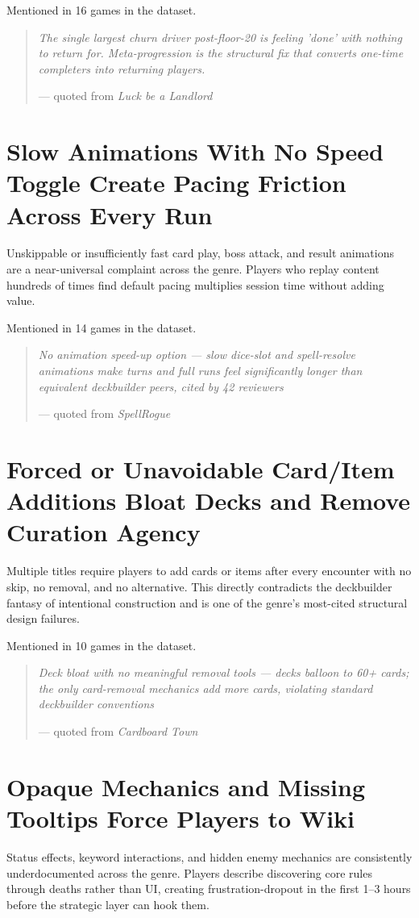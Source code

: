 \documentclass[11pt,letterpaper]{report}
\begin{document}
Mentioned in 16 games in the dataset.

\begin{quote}
\emph{The single largest churn driver post-floor-20 is feeling 'done' with nothing to return for. Meta-progression is the structural fix that converts one-time completers into returning players.}

— quoted from \emph{Luck be a Landlord}
\end{quote}
\section*{Slow Animations With No Speed Toggle Create Pacing Friction Across Every Run}
\label{sec:orge6fc1d0}
Unskippable or insufficiently fast card play, boss attack, and result animations are a near-universal complaint across the genre. Players who replay content hundreds of times find default pacing multiplies session time without adding value.

Mentioned in 14 games in the dataset.

\begin{quote}
\emph{No animation speed-up option — slow dice-slot and spell-resolve animations make turns and full runs feel significantly longer than equivalent deckbuilder peers, cited by 42 reviewers}

— quoted from \emph{SpellRogue}
\end{quote}
\section*{Forced or Unavoidable Card/Item Additions Bloat Decks and Remove Curation Agency}
\label{sec:orgecfb5f4}
Multiple titles require players to add cards or items after every encounter with no skip, no removal, and no alternative. This directly contradicts the deckbuilder fantasy of intentional construction and is one of the genre's most-cited structural design failures.

Mentioned in 10 games in the dataset.

\begin{quote}
\emph{Deck bloat with no meaningful removal tools — decks balloon to 60+ cards; the only card-removal mechanics add more cards, violating standard deckbuilder conventions}

— quoted from \emph{Cardboard Town}
\end{quote}
\section*{Opaque Mechanics and Missing Tooltips Force Players to Wiki}
\label{sec:orge098111}
Status effects, keyword interactions, and hidden enemy mechanics are consistently underdocumented across the genre. Players describe discovering core rules through deaths rather than UI, creating frustration-dropout in the first 1–3 hours before the strategic layer can hook them.
\end{document}

